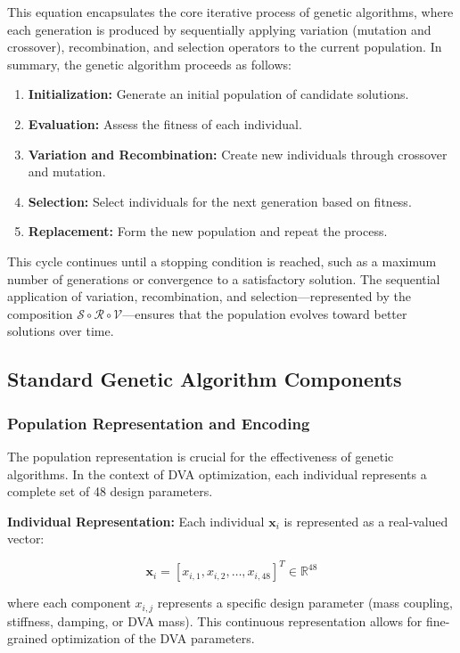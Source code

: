 \documentclass[12pt,a4paper]{article}
\begin{document}
This equation encapsulates the core iterative process of genetic algorithms, where each generation is produced by sequentially applying variation (mutation and crossover), recombination, and selection operators to the current population. 
In summary, the genetic algorithm proceeds as follows:
\begin{enumerate}
    \item \textbf{Initialization:} Generate an initial population of candidate solutions.
    \item \textbf{Evaluation:} Assess the fitness of each individual.
    \item \textbf{Variation and Recombination:} Create new individuals through crossover and mutation.
    \item \textbf{Selection:} Select individuals for the next generation based on fitness.
    \item \textbf{Replacement:} Form the new population and repeat the process.
\end{enumerate}
This cycle continues until a stopping condition is reached, such as a maximum number of generations or convergence to a satisfactory solution. The sequential application of variation, recombination, and selection—represented by the composition $\mathcal{S} \circ \mathcal{R} \circ \mathcal{V}$—ensures that the population evolves toward better solutions over time.

\subsection{Standard Genetic Algorithm Components}

\subsubsection{Population Representation and Encoding}

The population representation is crucial for the effectiveness of genetic algorithms. In the context of DVA optimization, each individual represents a complete set of 48 design parameters.

\textbf{Individual Representation:} Each individual $\mathbf{x}_i$ is represented as a real-valued vector:

\begin{equation}\label{Eq.individual_representation}
\mathbf{x}_i = [x_{i,1}, x_{i,2}, \ldots, x_{i,48}]^T \in \mathbb{R}^{48}
\end{equation}

where each component $x_{i,j}$ represents a specific design parameter (mass coupling, stiffness, damping, or DVA mass). This continuous representation allows for fine-grained optimization of the DVA parameters.
\end{document}
